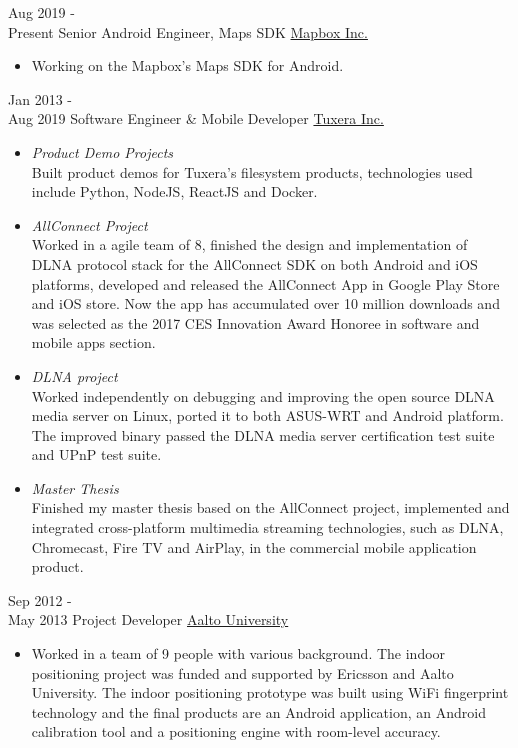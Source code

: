 \documentclass[letterpaper]{twentysecondcv} %
\begin{document}
\begin{twenty} %
    \twentyitem
    	{Aug 2019 - \\Present}
        {Senior Android Engineer, Maps SDK}
        {\href{http://www.mapbox.com/}{Mapbox Inc.}}
        {}
        {
        {\begin{itemize}
        \item Working on the Mapbox's Maps SDK for Android.
    \end{itemize}}
        }
	\twentyitem
    	{Jan 2013 - \\ Aug 2019}
        {Software Engineer \& Mobile Developer}
        {\href{http://www.tuxera.com/}{Tuxera Inc.}}
        {}
        {
        {\begin{itemize}
        \item \textit{Product Demo Projects} \\Built product demos for Tuxera's filesystem products, technologies used include Python, NodeJS, ReactJS and Docker.
        \item \textit{AllConnect Project} \\Worked in a agile team of 8, finished the design and implementation of DLNA protocol stack for the AllConnect SDK on both Android and iOS platforms, developed and released the AllConnect App in Google Play Store and iOS store. Now the app has accumulated over 10 million downloads and was selected as the 2017 CES Innovation Award Honoree in software and mobile apps section.
        \item \textit{DLNA project} \\Worked independently on debugging and improving the open source DLNA media server on Linux, ported it to both ASUS-WRT and Android platform. The improved binary passed the DLNA media server certification test suite and UPnP test suite.
        \item \textit{Master Thesis} \\Finished my master thesis based on the AllConnect project, implemented and integrated cross-platform multimedia streaming technologies, such as DLNA, Chromecast, Fire TV and AirPlay, in the commercial mobile application product.
    \end{itemize}}
        }
        
    \twentyitem
   		{Sep 2012 - \\ May 2013}
        {Project Developer}
        {\href{http://www.aalto.fi/en/}{Aalto University}}
        {}
        {
        {\begin{itemize}
        \item Worked in a team of 9 people with various background. The indoor positioning project was funded and supported by Ericsson and Aalto University. The indoor positioning prototype was built using WiFi fingerprint technology and the final products are an Android application, an Android calibration tool and a positioning engine with room-level accuracy.
    \end{itemize}}
        }
        
\end{twenty}
\end{document}
